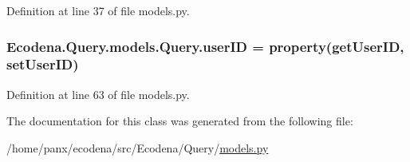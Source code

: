 Definition at line 37 of file models.py.

\hypertarget{class_ecodena_1_1_query_1_1models_1_1_query_a7b6043377cba81b1cd1f29dbba5a0a66}{
\subsubsection[{userID}]{\setlength{\rightskip}{0pt plus 5cm}Ecodena.Query.models.Query.userID = property(getUserID, setUserID)}}
\label{de/d81/class_ecodena_1_1_query_1_1models_1_1_query_a7b6043377cba81b1cd1f29dbba5a0a66}


Definition at line 63 of file models.py.



The documentation for this class was generated from the following file:\begin{DoxyCompactItemize}
\item 
/home/panx/ecodena/src/Ecodena/Query/\hyperlink{_query_2models_8py}{models.py}\end{DoxyCompactItemize}
